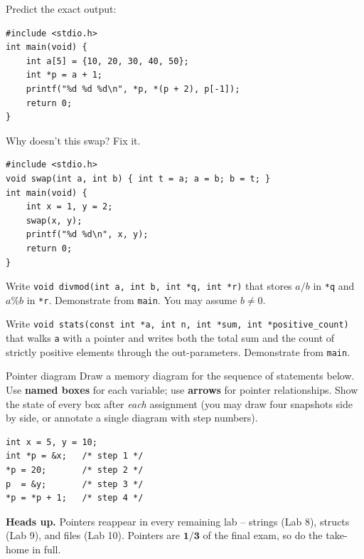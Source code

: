 \documentclass[11pt]{article}
\begin{document}
\begin{trace}
Predict the exact output:
\begin{lstlisting}
#include <stdio.h>
int main(void) {
    int a[5] = {10, 20, 30, 40, 50};
    int *p = a + 1;
    printf("%d %d %d\n", *p, *(p + 2), p[-1]);
    return 0;
}
\end{lstlisting}
\end{trace}

\begin{bug}
Why doesn't this swap? Fix it.
\begin{lstlisting}
#include <stdio.h>
void swap(int a, int b) { int t = a; a = b; b = t; }
int main(void) {
    int x = 1, y = 2;
    swap(x, y);
    printf("%d %d\n", x, y);
    return 0;
}
\end{lstlisting}
\end{bug}

\begin{writecode}
Write \texttt{void divmod(int a, int b, int *q, int *r)} that stores $a/b$ in
\texttt{*q} and $a\%b$ in \texttt{*r}. Demonstrate from \texttt{main}.
You may assume $b \neq 0$.
\end{writecode}

\begin{writecode}
Write \texttt{void stats(const int *a, int n, int *sum, int *positive\_count)}
that walks \texttt{a} with a pointer and writes both the total sum and the count of
strictly positive elements through the out-parameters. Demonstrate from \texttt{main}.
\end{writecode}

\begin{drawex}{Pointer diagram}
Draw a memory diagram for the sequence of statements below.
Use \textbf{named boxes} for each variable; use \textbf{arrows} for pointer relationships.
Show the state of every box after \emph{each} assignment (you may draw four snapshots
side by side, or annotate a single diagram with step numbers).
\begin{lstlisting}
int x = 5, y = 10;
int *p = &x;   /* step 1 */
*p = 20;       /* step 2 */
p  = &y;       /* step 3 */
*p = *p + 1;   /* step 4 */
\end{lstlisting}
\end{drawex}

\vspace{4pt}
\noindent\textbf{Heads up.} Pointers reappear in every remaining lab -- strings (Lab 8),
structs (Lab 9), and files (Lab 10). Pointers are \(\mathbf{1/3}\) of the final exam,
so do the take-home in full.
\end{document}
